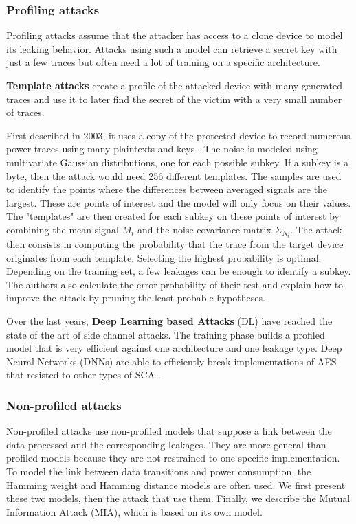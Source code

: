 \documentclass[11pt]{sdm}
\begin{document}
\subsubsection{Profiling attacks}

Profiling attacks assume that the attacker has access to a clone device to model its leaking behavior.
Attacks using such a model can retrieve a secret key with just a few traces but often need a lot of training on a specific architecture.

\textbf{Template attacks} create a profile of the attacked device with many generated traces and use it to later find the secret of the victim with a very small number of traces.

First described in 2003, it uses a copy of the protected device to record numerous power traces using many plaintexts and keys \parencite{Chari_Rao_Rohatgi_2003}.
The noise is modeled using multivariate Gaussian distributions, one for each possible subkey.
If a subkey is a byte, then the attack would need 256 different templates.
The samples are used to identify the points where the differences between averaged signals are the largest.
These are points of interest and the model will only focus on their values.
The "templates" are then created for each subkey on these points of interest by combining the mean signal $M_i$ and the noise covariance matrix $\Sigma_{N_i}$.
The attack then consists in computing the probability that the trace from the target device originates from each template.
Selecting the highest probability is optimal.
Depending on the training set, a few leakages can be enough to identify a subkey.
The authors also calculate the error probability of their test and explain how to improve the attack by pruning the least probable hypotheses.


Over the last years, \textbf{Deep Learning based Attacks} (DL) have reached the state of the art of side channel attacks.
The training phase builds a profiled model that is very efficient against one architecture and one leakage type.
Deep Neural Networks (DNNs) are able to efficiently break implementations of AES that resisted to other types of SCA \parencite{Maghrebi_Portigliatti_Prouff_2016}.

\subsubsection{Non-profiled attacks}

Non-profiled attacks use non-profiled models that suppose a link between the data processed and the corresponding leakages.
They are more general than profiled models because they are not restrained to one specific implementation.
To model the link between data transitions and power consumption, the Hamming weight and Hamming distance models are often used.
We first present these two models, then the attack that use them.
Finally, we describe the Mutual Information Attack (MIA), which is based on its own model.
\end{document}
